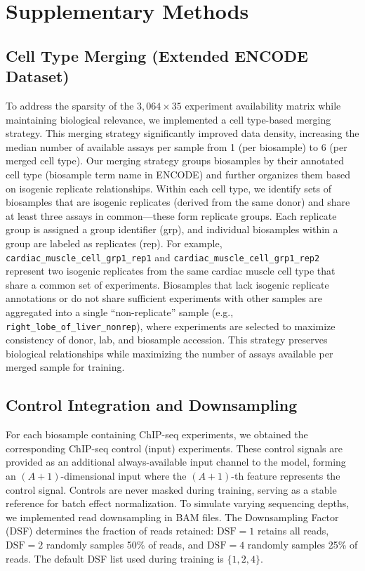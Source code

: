 \section{Supplementary Methods}

\subsection{Cell Type Merging (Extended ENCODE Dataset)}

To address the sparsity of the $3{,}064 \times 35$ experiment availability matrix while maintaining biological relevance, we implemented a cell type-based merging strategy. This merging strategy significantly improved data density, increasing the median number of available assays per sample from 1 (per biosample) to 6 (per merged cell type). Our merging strategy groups biosamples by their annotated cell type (biosample term name in ENCODE) and further organizes them based on isogenic replicate relationships. Within each cell type, we identify sets of biosamples that are isogenic replicates (derived from the same donor) and share at least three assays in common---these form replicate groups. Each replicate group is assigned a group identifier (grp), and individual biosamples within a group are labeled as replicates (rep). For example, \texttt{cardiac\_muscle\_cell\_grp1\_rep1} and \texttt{cardiac\_muscle\_cell\_grp1\_rep2} represent two isogenic replicates from the same cardiac muscle cell type that share a common set of experiments. Biosamples that lack isogenic replicate annotations or do not share sufficient experiments with other samples are aggregated into a single ``non-replicate'' sample (e.g., \texttt{right\_lobe\_of\_liver\_nonrep}), where experiments are selected to maximize consistency of donor, lab, and biosample accession. This strategy preserves biological relationships while maximizing the number of assays available per merged sample for training.

\subsection{Control Integration and Downsampling}

For each biosample containing ChIP-seq experiments, we obtained the corresponding ChIP-seq control (input) experiments. These control signals are provided as an additional always-available input channel to the model, forming an $(A+1)$-dimensional input where the $(A+1)$-th feature represents the control signal. Controls are never masked during training, serving as a stable reference for batch effect normalization. To simulate varying sequencing depths, we implemented read downsampling in BAM files. The Downsampling Factor (DSF) determines the fraction of reads retained: $\text{DSF} = 1$ retains all reads, $\text{DSF} = 2$ randomly samples 50\% of reads, and $\text{DSF} = 4$ randomly samples 25\% of reads. The default DSF list used during training is $\{1, 2, 4\}$.

